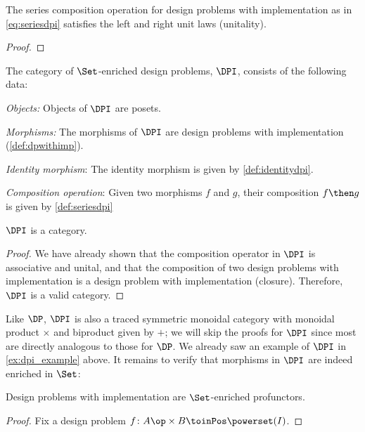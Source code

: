 \begin{lemma}
The series composition operation for design problems with implementation as in \cref{eq:seriesdpi} satisfies the left and right unit laws (unitality).
\end{lemma}

\begin{proof}
\end{proof}


\begin{definition}
The category of $\Set$-enriched design problems, $\DPI$, consists of the following data:
\begin{compactenum}
\item \emph{Objects:}  Objects of $\DPI$ are posets.
\item \emph{Morphisms:} The morphisms of $\DPI$ are design problems with implementation (\cref{def:dpwithimp}).
\item \emph{Identity morphism}: The identity morphism is given by \cref{def:identitydpi}.
\item \emph{Composition operation}: Given two morphisms $f$ and $g$, their composition $f\then g$ is given by \cref{def:seriesdpi}
\end{compactenum}
\end{definition}

\begin{lemma}
$\DPI$ is a category.
\end{lemma}

\begin{proof}
We have already shown that the composition operator in $\DPI$ is associative and unital, and that the composition of two design problems with implementation is a design problem with implementation (closure). Therefore, $\DPI$ is a valid category.
\end{proof}

Like $\DP$, $\DPI$ is also a traced symmetric monoidal category with monoidal product $\times$ and biproduct given by $+$; we will skip the proofs for $\DPI$ since most are directly analogous to those for $\DP$. We already saw an example of $\DPI$ in \cref{ex:dpi_example} above. It remains to verify that morphisms in $\DPI$ are indeed enriched in $\Set$:

\begin{proposition}
Design problems with implementation are $\Set$-enriched profunctors.
\end{proposition}
\begin{proof}
Fix a design problem $f \colon A\op \times B \toinPos \powerset(I)$.
\end{proof}

